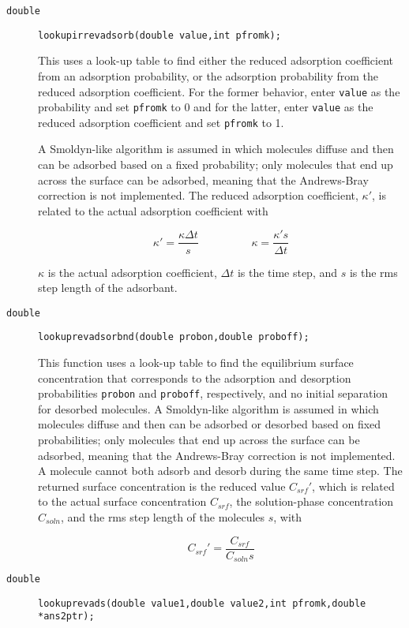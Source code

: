 \documentclass[11pt]{article}
\newcommand {\ttt} {\texttt}
\begin{document}
\begin{description}
\item[\ttt{double}]
\ttt{lookupirrevadsorb(double value,int pfromk);}

This uses a look-up table to find either the reduced adsorption coefficient from an adsorption probability, or the adsorption probability from the reduced adsorption coefficient. For the former behavior, enter \ttt{value} as the probability and set \ttt{pfromk} to 0 and for the latter, enter \ttt{value} as the reduced adsorption coefficient and set \ttt{pfromk} to 1.

A Smoldyn-like algorithm is assumed in which molecules diffuse and then can be adsorbed based on a fixed probability; only molecules that end up across the surface can be adsorbed, meaning that the Andrews-Bray correction is not implemented. The reduced adsorption coefficient, $\kappa'$, is related to the actual adsorption coefficient with

$$\kappa' = \frac{\kappa \Delta t}{s}
\hspace{2cm}
\kappa = \frac{\kappa' s}{\Delta t}$$		 	 

$\kappa$ is the actual adsorption coefficient, $\Delta t$ is the time step, and $s$ is the rms step length of the adsorbant.

\item[\ttt{double}]
\ttt{lookuprevadsorbnd(double probon,double proboff);}

This function uses a look-up table to find the equilibrium surface concentration that corresponds to the adsorption and desorption probabilities \ttt{probon} and \ttt{proboff}, respectively, and no initial separation for desorbed molecules. A Smoldyn-like algorithm is assumed in which molecules diffuse and then can be adsorbed or desorbed based on fixed probabilities; only molecules that end up across the surface can be adsorbed, meaning that the Andrews-Bray correction is not implemented. A molecule cannot both adsorb and desorb during the same time step. The returned surface concentration is the reduced value $C_{srf}'$, which is related to the actual surface concentration $C_{srf}$, the solution-phase concentration $C_{soln}$, and the rms step length of the molecules $s$, with

$$C_{srf}' = \frac{C_{srf}}{C_{soln} s}$$		 


\item[\ttt{double}]
\ttt{lookuprevads(double value1,double value2,int pfromk,double *ans2ptr);}


\end{description}
\end{document}
